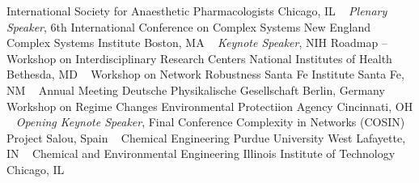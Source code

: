 \newline
    International Society for Anaesthetic Pharmacologists
    \newline
Chicago, IL
\newline
~
\Gap
{}
\textit{Plenary Speaker}, 6th International Conference on Complex Systems
\newline
    New England Complex Systems Institute
    \newline
Boston, MA
\newline
~
\Gap
{}
\textit{Keynote Speaker}, NIH Roadmap -- Workshop on Interdisciplinary Research Centers
\newline
    National Institutes of Health
    \newline
Bethesda, MD
\newline
~
\Gap
{}
Workshop on Network Robustness
\newline
    Santa Fe Institute
    \newline
Santa Fe, NM
\newline
~
\Gap
{}
Annual Meeting
\newline
    Deutsche Physikalische Gesellschaft
    \newline
Berlin, Germany
\newline
~
\Gap
{}
Workshop on Regime Changes
\newline
    Environmental Protectiion Agency
    \newline
Cincinnati, OH
\newline
~
\Gap
{}
\textit{Opening Keynote Speaker}, Final Conference
\newline
    Complexity in Networks (COSIN) Project
    \newline
Salou, Spain
\newline
~
\Gap
{}
Chemical Engineering
\newline
    Purdue University
    \newline
West Lafayette, IN
\newline
~
\Gap
{}
Chemical and Environmental Engineering
\newline
    Illinois Institute of Technology
    \newline
Chicago, IL
\newline
~
\Gap
{}
